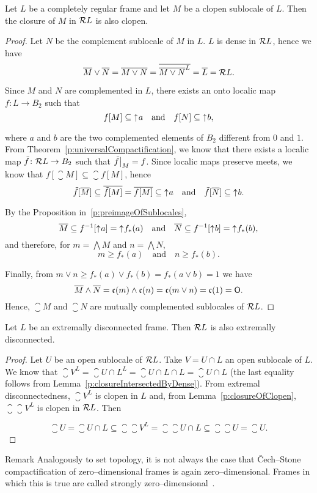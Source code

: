 \begin{lemma}\label{p:closureOfClopen}
    Let $L$ be a completely regular frame and let $M$ be a clopen sublocale of $L$. Then the closure of $M$ in $\mathcal{R} L$ is also clopen.
\end{lemma}
\begin{proof}
    Let $N$ be the complement sublocale of $M$ in $L$. $L$ is dense in $\mathcal{R} L$, hence we have
    $$ \overline{M}\vee \overline{N} = \overline{M\vee N} = \overline{\overline{M\vee N}^L} = \overline{L} = \mathcal{R} L. $$

    Since $M$ and $N$ are complemented in $L$, there exists an onto localic map $f\colon L\to B_2$ such that
    $$ f[M] \subseteq \mathord{\uparrow}\mkern1mu a\quad\text{and}\quad f[N]\subseteq \mathord{\uparrow}\mkern1mu b, $$

    \noindent where $a$ and $b$ are the two complemented elements of $B_2$ different from $0$ and $1$.
    From Theorem~\ref{p:universalCompactification}, we know that there exists a localic map $\tilde f\colon \mathcal{R} L\to B_2$ such that $\restr{\tilde f}{M} = f$.
    Since localic maps preserve meets, we know that $f[\closure M]\subseteq \closure{f[M]}$, hence
    $$ \tilde f[\overline{M}] \subseteq \overline{\tilde f[M]} = \overline{f[M]} \subseteq \mathord{\uparrow}\mkern1mu a\quad\text{and}\quad \tilde f[\overline{N}] \subseteq \mathord{\uparrow}\mkern1mu b. $$

    \noindent By the Proposition in~\ref{p:preimageOfSublocales},
    $$ \overline{M} \subseteq f^{-1}[\mathord{\uparrow}\mkern1mu a] = \mathord{\uparrow}\mkern1mu f_*(a) \quad\text{and}\quad \overline{N} \subseteq f^{-1}[\mathord{\uparrow}\mkern1mu b] = \mathord{\uparrow}\mkern1mu f_*(b), $$
    and therefore, for $m = \bigwedge M$ and $n = \bigwedge N$,
    $$ m \geq f_*(a)\quad\text{and}\quad n \geq f_*(b).$$

    \noindent Finally, from $m\vee n \geq f_*(a)\vee f_*(b) = f_*(a\vee b) = 1$ we have
    $$ \overline{M}\wedge \overline{N} = \mathfrak{c}(m)\wedge \mathfrak{c}(n) = \mathfrak{c}(m\vee n) = \mathfrak{c}(1) = \mathsf{O}. $$
    Hence, $\closure{M}$ and $\closure{N}$ are mutually complemented sublocales of $\mathcal{R} L$.
\end{proof}

\begin{proposition}\label{p:extrDiscPreserv}
    Let $L$ be an extremally disconnected frame. Then $\mathcal{R} L$ is also extremally disconnected.
\end{proposition}
\begin{proof}
    Let $U$ be an open sublocale of $\mathcal{R} L$. Take $V = U\cap L$ an open sublocale of $L$. We know that $\closure V^L = \closure{U\cap L}^L = \closure{U\cap L}\cap L = \closure U\cap L$ (the last equality follows from Lemma~\ref{p:closureIntersectedByDense}). From extremal disconnectedness, $\closure V^L$ is clopen in $L$ and, from Lemma~\ref{p:closureOfClopen}, $\closure{\closure V^L}$ is clopen in $\mathcal{R} L$. Then

    $$ \closure U = \closure{U\cap L} \subseteq \closure{\closure{V}^L} = \closure{\closure U\cap L} \subseteq \closure{\closure U} = \closure U.$$
\end{proof}

\begin{block}{Remark}
    Analogously to set topology, it is not always the case that Čech--Stone compactification of zero--dimensional frames is again zero--dimensional. Frames in which this is true are called strongly zero--dimensional~\cite{kou2002strongly}.
\end{block}
